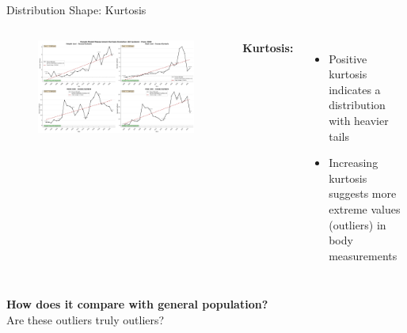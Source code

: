 \documentclass[aspectratio=169,xcolor=dvipsnames,10pt]{beamer}
\begin{document}
\begin{frame}{Distribution Shape: Kurtosis}

    \begin{columns}
                \begin{figure}
                    \includegraphics[width=\textwidth]{figures/kurtosis_evolution_female_eu_from_2000.png}
                \end{figure}
            \textbf{Kurtosis:} 
                \begin{itemize}
                    \setlength{\itemsep}{0.6em}
                    \pause \item Positive kurtosis indicates a distribution with heavier tails
                    \pause \item Increasing kurtosis suggests more extreme values (outliers) in body measurements
                \end{itemize}
        
        \end{columns}
\end{frame}


\begin{frame}
    \Large{
        \begin{center}
            \textbf{How does it compare with general population?} \\
            \vspace{1em}
            Are these outliers truly outliers?\\
        \end{center}
    }
\end{frame}
\end{document}
